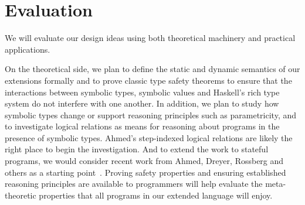




\section{Evaluation}
\label{sec:eval}

We will evaluate our design ideas using both theoretical machinery and
practical applications.

On the theoretical side, we plan to define the 
static and dynamic semantics of our extensions formally and 
to prove classic type safety theorems to ensure that the interactions
between symbolic types, symbolic values and Haskell's rich type system
do not interfere with one another.  In addition, we plan to study
how symbolic types change or support reasoning principles such as
parametricity, and to investigate logical relations as means
for reasoning about programs in the presence of symbolic types.  
Ahmed's step-indexed logical relations are likely the right place
to begin the investigation.  And to extend the work to stateful programs,
we would consider recent work from Ahmed, Dreyer, Rossberg and others 
as a starting
point~\cite{Ahmed:state-logical-relations,Dreyer:logical-relations}.
Proving safety properties and ensuring established reasoning principles
are available to programmers will help evaluate the meta-theoretic
properties that all programs in our extended language will enjoy.

